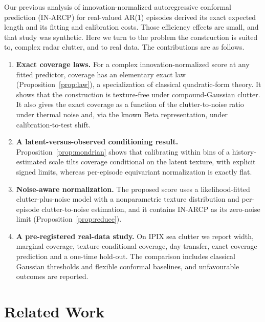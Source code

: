 \documentclass[nolineno]{ieeeaccess}
\begin{document}
Our previous analysis of innovation-normalized autoregressive conformal prediction (IN-ARCP) for real-valued AR(1) episodes derived its exact expected length and its fitting and calibration costs. Those efficiency effects are small, and that study was synthetic. Here we turn to the problem the construction is suited to, complex radar clutter, and to real data. The contributions are as follows.
\begin{enumerate}[leftmargin=*,itemsep=2pt]
\item \textbf{Exact coverage laws.} For a complex innovation-normalized score at any fitted predictor, coverage has an elementary exact law (Proposition~\ref{prop:law}), a specialization of classical quadratic-form theory. It shows that the construction is texture-free under compound-Gaussian clutter. It also gives the exact coverage as a function of the clutter-to-noise ratio under thermal noise and, via the known Beta representation, under calibration-to-test shift.
\item \textbf{A latent-versus-observed conditioning result.} Proposition~\ref{prop:mondrian} shows that calibrating within bins of a history-estimated scale tilts coverage conditional on the latent texture, with explicit signed limits, whereas per-episode equivariant normalization is exactly flat.
\item \textbf{Noise-aware normalization.} The proposed score uses a likelihood-fitted clutter-plus-noise model with a nonparametric texture distribution and per-episode clutter-to-noise estimation, and it contains IN-ARCP as its zero-noise limit (Proposition~\ref{prop:reduce}).
\item \textbf{A pre-registered real-data study.} On IPIX sea clutter we report width, marginal coverage, texture-conditional coverage, day transfer, exact coverage prediction and a one-time hold-out. The comparison includes classical Gaussian thresholds and flexible conformal baselines, and unfavourable outcomes are reported.
\end{enumerate}

\section{Related Work}
\end{document}
